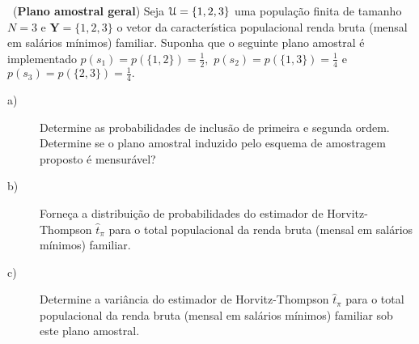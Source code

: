 \documentclass[a4paper,11pt,oneside,onecolumn]{Config/milktest}
\begin{document}
	
	

	
%			
%			
%	
	\balance
%	
%	
%	
	\medskip 
	\question~({\bf Plano amostral geral})    Seja 
	${\cal U}=\{1,2,3\}$ uma população finita de tamanho $N=3$ e $\mathbf{Y} =\{1,2,3\}$  o vetor da característica populacional renda bruta (mensal em salários mínimos) familiar.  Suponha que o seguinte plano amostral é implementado 
	$p(s_1)=p(\{1,2\})=\frac{1}{2},$ $p(s_2)=p(\{1,3\})=\frac{1}{4}$ e
	$p(s_3)=p(\{2,3\})=\frac{1}{4}.$
	\begin{description}
		\item[a)] Determine as probabilidades de inclusão de primeira e  segunda ordem. Determine se o plano amostral induzido pelo esquema de amostragem proposto é mensurável? 
		\item[b)] Forneça a distribuição de probabilidades do estimador de Horvitz-Thompson $\hat{t}_\pi$ para o total populacional da renda bruta (mensal em salários mínimos) familiar.
		\item[c)] Determine a variância do estimador de Horvitz-Thompson $\hat{t}_\pi$ para o total populacional da renda bruta (mensal em salários mínimos) familiar sob este plano amostral.
	\end{description}
	
\end{document}
